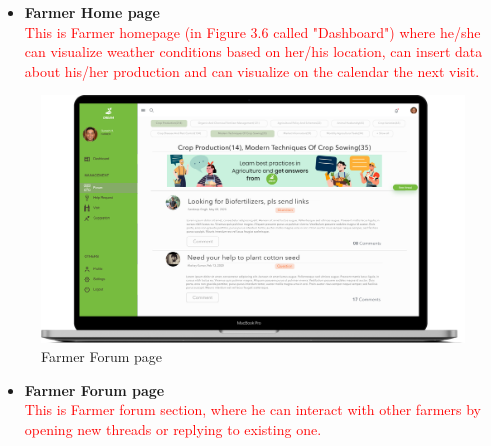 \begin{itemize}
    \item \textbf{Farmer Home page}\\ 
    \textcolor{red}{This is Farmer homepage (in Figure 3.6 called "Dashboard") where he/she can visualize weather conditions based on her/his location, can insert data about his/her production and can visualize on the calendar the next visit.}
\end{itemize}


\begin{figure}[H]
  \includegraphics[width=140mm,scale=0.9]{./Images//Mocks/WebApp/Farmer_Forum.png}
  \caption{Farmer Forum page}
\end{figure}

\begin{itemize}
    \item \textbf{Farmer Forum page}\\ 
    \textcolor{red}{This is Farmer forum section, where he can interact with other farmers by opening new threads or replying to existing one.}
\end{itemize}


